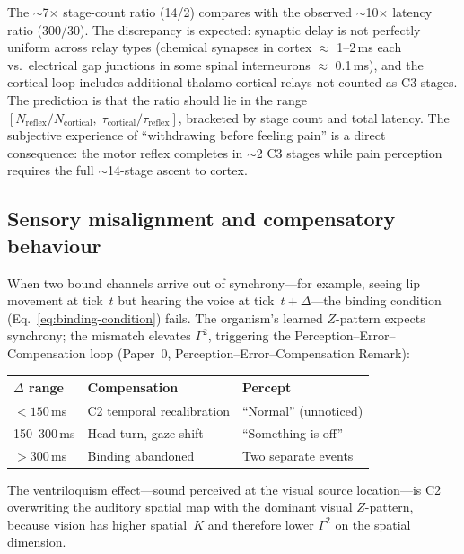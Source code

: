 \documentclass[aps,pre,twocolumn,superscriptaddress,floatfix]{revtex4-2}
\begin{document}
\begin{remark}
\begin{enumerate}
    The $\sim$7$\times$ stage-count ratio
    (14/2) compares with the observed
    $\sim$10$\times$ latency ratio (300/30).
    The discrepancy is expected: synaptic delay
    is not perfectly uniform across relay types
    (chemical synapses in cortex $\approx$
    1--2\,ms each vs.\ electrical gap junctions in
    some spinal interneurons $\approx$ 0.1\,ms),
    and the cortical loop includes additional
    thalamo-cortical relays not counted as C3
    stages.
    The prediction is that the ratio should lie
    in the range $[N_{\text{reflex}}/N_{\text{cortical}},\;
    \tau_{\text{cortical}}/\tau_{\text{reflex}}]$,
    bracketed by stage count and total latency.
    The subjective experience of ``withdrawing before
    feeling pain'' is a direct consequence: the motor
    reflex completes in $\sim$2 C3 stages while pain
    perception requires the full $\sim$14-stage ascent
    to cortex.
\end{enumerate}
\end{remark}

\subsection{Sensory misalignment and compensatory behaviour}
\label{sec:misalignment}

When two bound channels arrive out of synchrony---for
example, seeing lip movement at tick~$t$ but hearing
the voice at tick~$t + \Delta$---the binding condition
(Eq.~\ref{eq:binding-condition}) fails.
The organism's learned $Z$-pattern expects synchrony;
the mismatch elevates $\Gamma^2$, triggering the
Perception--Error--Compensation loop
(Paper~0, Perception--Error--Compensation Remark):

\begin{center}
\begin{tabular}{lll}
\toprule
$\Delta$ range & Compensation & Percept \\
\midrule
$< 150$\,ms & C2 temporal recalibration &
  ``Normal'' (unnoticed) \\
150--300\,ms & Head turn, gaze shift &
  ``Something is off'' \\
$> 300$\,ms & Binding abandoned &
  Two separate events \\
\bottomrule
\end{tabular}
\end{center}

\noindent
The ventriloquism effect---sound perceived at the
visual source location---is C2 overwriting the auditory
spatial map with the dominant visual $Z$-pattern,
because vision has higher spatial~$K$ and therefore
lower $\Gamma^2$ on the spatial dimension.
\end{document}
